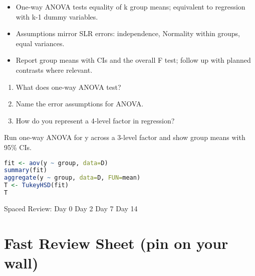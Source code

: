 \documentclass[11pt,a4paper]{article}
\def\textbf#1{#1}%
\newcommand{\reviewticks}{
  \vspace{0.4em}
  \noindent\scriptsize\textbf{Spaced Review:}
  \fbox{\phantom{D0}} Day 0\quad
  \fbox{\phantom{D2}} Day 2\quad
  \fbox{\phantom{D7}} Day 7\quad
  \fbox{\phantom{D14}} Day 14
}
\begin{document}
\begin{corebox}
\begin{itemize}
  \item One-way ANOVA tests equality of k group means; equivalent to regression with k-1 dummy variables.
  \item Assumptions mirror SLR errors: independence, Normality within groups, equal variances.
  \item Report group means with CIs and the overall F test; follow up with planned contrasts where relevant.
\end{itemize}
\end{corebox}

\begin{recallbox}
\begin{enumerate}
  \item What does one-way ANOVA test?
  \item Name the error assumptions for ANOVA.
  \item How do you represent a 4-level factor in regression?
\end{enumerate}
\end{recallbox}

\begin{practicebox}
Run one-way ANOVA for y across a 3-level factor and show group means with 95\% CIs.
\end{practicebox}

\begin{rbox}
\begin{lstlisting}[language=R]
fit <- aov(y ~ group, data=D)
summary(fit)
aggregate(y ~ group, data=D, FUN=mean)
T <- TukeyHSD(fit)
T
\end{lstlisting}
\end{rbox}

\reviewticks

\section*{Fast Review Sheet (pin on your wall)}
\end{document}
